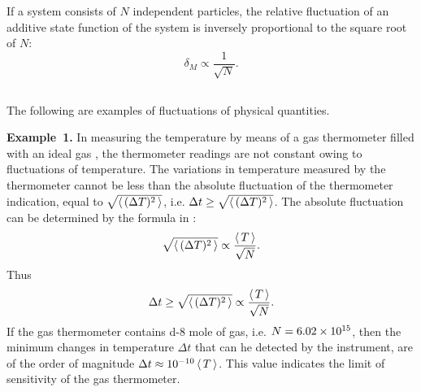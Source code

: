If a system consists of $N$ independent particles, the relative fluctuation of an additive state function  of the system is inversely proportional to the square root of $N$:
\begin{equation*}%
\delta_{M} \propto \frac{1}{\sqrt{N}}.
\end{equation*}

\subsection{}\label{11.6.4} The following are examples of fluctuations of physical quantities.

\textbf{Example~1.} In measuring the temperature by means of a gas thermometer filled with an ideal gas , the thermometer readings are not constant owing to fluctuations of temperature. The variations in temperature measured by the thermometer cannot be less than the absolute fluctuation of the thermometer indication, equal to $\sqrt{\expval{\,(\Delta T)^{2}\,}}$, i.e. $\Delta t \geq \sqrt{\expval{\,(\Delta T)^{2}\,}}$.
The absolute fluctuation can be determined by the formula in :
\begin{equation*}%
\sqrt{\expval{\,(\Delta T)^{2}\,}} \propto \frac{\expval{\,T \,}}{\sqrt{N}}.
\end{equation*}
Thus
\begin{equation*}%
\Delta t \geq \sqrt{\expval{\,(\Delta T)^{2}\,}} \propto \frac{\expval{\,T \,}}{\sqrt{N}}.
\end{equation*}
If the gas thermometer contains \num{d-8} mole of gas, i.e. $N = \num{6.02d15}$, then the minimum changes in temperature $\Delta t$ that can he detected by the instrument, are of the order of magnitude $\Delta t \approx \num{d-10}\expval{\,T \,}$. This value indicates the limit of sensitivity of the gas thermometer.

